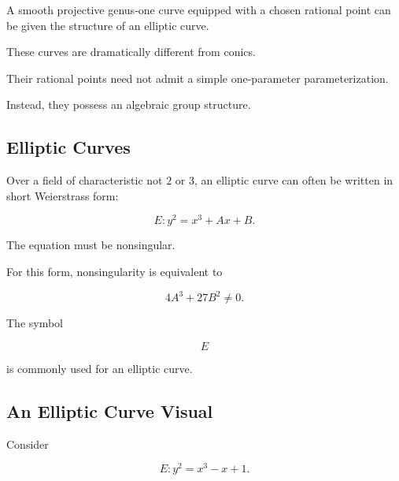 A smooth projective genus-one curve equipped with a chosen rational point
can be given the structure of an elliptic curve.

These curves are dramatically different from conics.

Their rational points need not admit a simple one-parameter
parameterization.

Instead, they possess an algebraic group structure.

\subsection{Elliptic Curves}
\label{subsec:elliptic-curves-diophantine}

Over a field of characteristic not \(2\) or \(3\), an elliptic curve can
often be written in short Weierstrass form:

\[ \boxed{E:y^2=x^3+Ax+B.} \]

The equation must be nonsingular.

For this form, nonsingularity is equivalent to

\[ 4A^3+27B^2\neq0. \]

The symbol

\[ E \]

is commonly used for an elliptic curve.

\subsection{An Elliptic Curve Visual}
\label{subsec:elliptic-curve-visual}

Consider

\[ E:y^2=x^3-x+1. \]

\begin{centereddiagram}
\end{centereddiagram}

